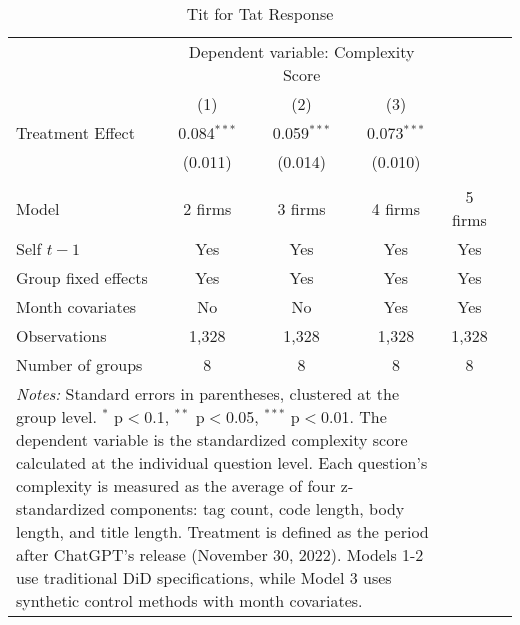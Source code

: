 \begin{table}[htpb!]
    \centering
    \caption{Tit for Tat Response}
    \label{tab:csscore_did_results}
    \begin{tabular}{lccccc}
    \toprule
    & \multicolumn{3}{c}{Dependent variable: Complexity Score} \\
    \cmidrule(lr){2-4}
    & (1) & (2) & (3) \\
    \midrule
    Treatment Effect         & 0.084$^{***}$ & 0.059$^{***}$ & 0.073$^{***}$ \\
    & (0.011)       & (0.014)       & (0.010) \\
    &               &               & \\
    \midrule
    Model                    & 2 firms       & 3 firms       & 4 firms & 5 firms \\
    Self $t-1$               & Yes           & Yes           & Yes     & Yes\\
    Group fixed effects      & Yes           & Yes           & Yes     & Yes\\
    Month covariates         & No            & No            & Yes     & Yes\\
    \midrule
    Observations             & 1,328         & 1,328         & 1,328   & 1,328\\
    Number of groups         & 8             & 8             & 8       & 8\\
    \bottomrule
    \multicolumn{4}{p{1\linewidth}}{\footnotesize \textit{Notes:} Standard errors in parentheses, clustered at the group level. $^{*}$ p$<$0.1, $^{**}$ p$<$0.05, $^{***}$ p$<$0.01. The dependent variable is the standardized complexity score calculated at the individual question level. Each question's complexity is measured as the average of four z-standardized components: tag count, code length, body length, and title length. Treatment is defined as the period after ChatGPT's release (November 30, 2022). Models 1-2 use traditional DiD specifications, while Model 3 uses synthetic control methods with month covariates.} \\
    \end{tabular}
\end{table}
